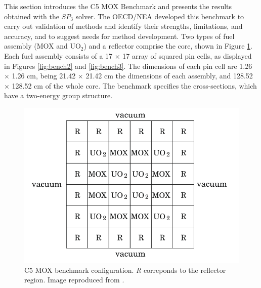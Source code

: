 \documentclass{anstrans}
\begin{document}
This section introduces the C5 MOX Benchmark \cite{cavarec_benchmark_1994} and presents the results obtained with the $SP_3$ solver.
The \gls{OECD}/\gls{NEA} developed this benchmark to carry out validation of methods and identify their strengths, limitations, and accuracy, and to suggest needs for method development.
Two types of fuel assembly (MOX and UO$_2$) and a reflector comprise the core, shown in Figure \ref{fig:bench1}.
Each fuel assembly consists of a 17 $\times$ 17 array of squared pin cells, as displayed in Figures \ref{fig:bench2} and \ref{fig:bench3}.
The dimensions of each pin cell are 1.26 $\times$ 1.26 cm, being 21.42 $\times$ 21.42 cm the dimensions of each assembly, and 128.52 $\times$ 128.52 cm of the whole core.
The benchmark \cite{cavarec_benchmark_1994} specifies the cross-sections, which have a two-energy group structure.

\begin{figure}[htbp!] %
    \centering
    \includegraphics[width=0.95\linewidth]{figures/bench-config.png}
    \hfill
    \caption{C5 MOX benchmark configuration. \textit{R} correponds to the reflector region. Image reproduced from \cite{capilla_applications_2009}.}
    \label{fig:bench1}
\end{figure}
\end{document}
